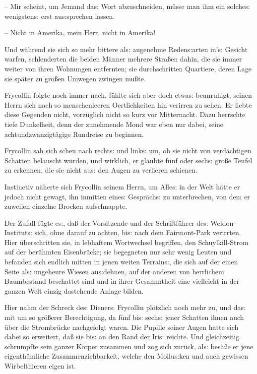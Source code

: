 \documentclass[oneside,12pt]{book}
\newcommand{\s}{s:}
\begin{document}
-- Mir scheint, um Jemand da{\s} Wort abzuschneiden, m\"usse man ihm
ein solche{\s} wenigsten{\s} erst au{\s}sprechen lassen.

-- Nicht in Amerika, mein Herr, nicht in Amerika!{\grqq}

Und w\"ahrend sie sich so mehr bittere al{\s} angenehme Reden{\s}arten
in'{\s} Gesicht warfen, schlenderten die beiden M\"anner mehrere
Stra{\ss}en dahin, die sie immer weiter von ihren Wohnungen
entfernten; sie durchschritten Quartiere, deren Lage sie sp\"ater zu
gro{\ss}en Umwegen zwingen mu{\ss}te.

Frycollin folgte noch immer nach, f\"uhlte sich aber doch etwa{\s}
beunruhigt, seinen Herrn sich nach so menschenleeren Oertlichkeiten
hin verirren zu sehen. Er liebte diese Gegenden nicht, vorz\"uglich
nicht so kurz vor Mitternacht. Dazu herrschte tiefe Dunkelheit, denn
der zunehmende Mond war eben nur dabei, {\glqq}seine
achtundzwanzigt\"agige Rundreise{\grqq} zu beginnen.

Frycollin sah sich scheu nach recht{\s} und link{\s} um, ob sie nicht
von verd\"achtigen Schatten belauscht w\"urden, und wirklich, er
glaubte f\"unf oder sech{\s} gro{\ss}e Teufel zu erkennen, die sie
nicht au{\s} den Augen zu verlieren schienen.

Instinctiv n\"aherte sich Frycollin seinem Herrn, um Alle{\s} in der
Welt h\"atte er jedoch nicht gewagt, ihn inmitten eine{\s}
Gespr\"ach{\s} zu unterbrechen, von dem er zuweilen einzelne Brocken
aufschnappte.

Der Zufall f\"ugte e{\s}, da{\ss} der Vorsitzende und der
Schriftf\"uhrer de{\s} Weldon-Institut{\s} sich, ohne darauf zu
achten, bi{\s} nach dem Fairmont-Park verirrten. Hier \"uberschritten
sie, in lebhaftem Wortwechsel begriffen, den Schuylkill-Strom auf der
ber\"uhmten Eisenbr\"ucke; sie begegneten nur sehr wenig Leuten und
befanden sich endlich mitten in jenen weiten Terrain{\s}, die sich
auf der einen Seite al{\s} ungeheure Wiesen au{\s}dehnen, auf der
anderen von herrlichem Baumbestand beschattet sind und in ihrer
Gesammtheit eine vielleicht in der ganzen Welt einzig dastehende
Anlage bilden.

Hier nahm der Schreck de{\s} Diener{\s} Frycollin pl\"otzlich noch
mehr zu, und da{\s} mit um so gr\"o{\ss}erer Berechtigung, da f\"unf
bi{\s} sech{\s} jener Schatten ihnen auch \"uber die Strombr\"ucke
nachgefolgt waren. Die Pupille seiner Augen hatte sich dabei so
erweitert, da{\ss} sie bi{\s} an den Rand der Iri{\s} reichte. Und
gleichzeitig schrumpfte sein ganzer K\"orper zusammen und zog sich
zur\"uck, al{\s} bes\"a{\ss}e er jene eigenth\"umliche
Zusammenziehbarkeit, welche den Mollu{\s}ken und auch gewissen
Wirbelthieren eigen ist.
\end{document}

